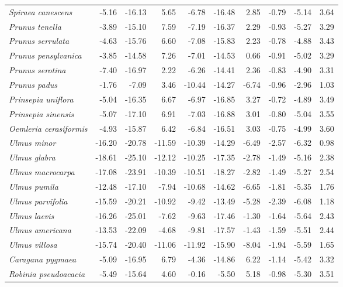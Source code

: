 \documentclass[11pt]{article}
\begin{document}
\begin{longtable}{lrrrrrrrrr}
  \emph{Spiraea canescens} & -5.16 & -16.13 & 5.65 & -6.78 & -16.48 & 2.85 & -0.79 & -5.14 & 3.64 \\ 
  \emph{Prunus tenella} & -3.89 & -15.10 & 7.59 & -7.19 & -16.37 & 2.29 & -0.93 & -5.27 & 3.29 \\ 
  \emph{Prunus serrulata} & -4.63 & -15.76 & 6.60 & -7.08 & -15.83 & 2.23 & -0.78 & -4.88 & 3.43 \\ 
  \emph{Prunus pensylvanica} & -3.85 & -14.58 & 7.26 & -7.01 & -14.53 & 0.66 & -0.91 & -5.02 & 3.29 \\ 
  \emph{Prunus serotina} & -7.40 & -16.97 & 2.22 & -6.26 & -14.41 & 2.36 & -0.83 & -4.90 & 3.31 \\ 
  \emph{Prunus padus} & -1.76 & -7.09 & 3.46 & -10.44 & -14.27 & -6.74 & -0.96 & -2.96 & 1.03 \\ 
  \emph{Prinsepia uniflora} & -5.04 & -16.35 & 6.67 & -6.97 & -16.85 & 3.27 & -0.72 & -4.89 & 3.49 \\ 
  \emph{Prinsepia sinensis} & -5.07 & -17.10 & 6.91 & -7.03 & -16.88 & 3.01 & -0.80 & -5.04 & 3.55 \\ 
  \emph{Oemleria cerasiformis} & -4.93 & -15.87 & 6.42 & -6.84 & -16.51 & 3.03 & -0.75 & -4.99 & 3.60 \\ 
  \emph{Ulmus minor} & -16.20 & -20.78 & -11.59 & -10.39 & -14.29 & -6.49 & -2.57 & -6.32 & 0.98 \\ 
  \emph{Ulmus glabra} & -18.61 & -25.10 & -12.12 & -10.25 & -17.35 & -2.78 & -1.49 & -5.16 & 2.38 \\ 
  \emph{Ulmus macrocarpa} & -17.08 & -23.91 & -10.39 & -10.51 & -18.27 & -2.82 & -1.49 & -5.27 & 2.54 \\ 
  \emph{Ulmus pumila} & -12.48 & -17.10 & -7.94 & -10.68 & -14.62 & -6.65 & -1.81 & -5.35 & 1.76 \\ 
  \emph{Ulmus parvifolia} & -15.59 & -20.21 & -10.92 & -9.42 & -13.49 & -5.28 & -2.39 & -6.08 & 1.18 \\ 
  \emph{Ulmus laevis} & -16.26 & -25.01 & -7.62 & -9.63 & -17.46 & -1.30 & -1.64 & -5.64 & 2.43 \\ 
  \emph{Ulmus americana} & -13.53 & -22.09 & -4.68 & -9.81 & -17.57 & -1.43 & -1.59 & -5.51 & 2.44 \\ 
  \emph{Ulmus villosa} & -15.74 & -20.40 & -11.06 & -11.92 & -15.90 & -8.04 & -1.94 & -5.59 & 1.65 \\ 
  \emph{Caragana pygmaea} & -5.09 & -16.95 & 6.79 & -4.36 & -14.86 & 6.22 & -1.14 & -5.42 & 3.32 \\ 
  \emph{Robinia pseudoacacia} & -5.49 & -15.64 & 4.60 & -0.16 & -5.50 & 5.18 & -0.98 & -5.30 & 3.51 \\ 

\end{longtable}
\end{document}
